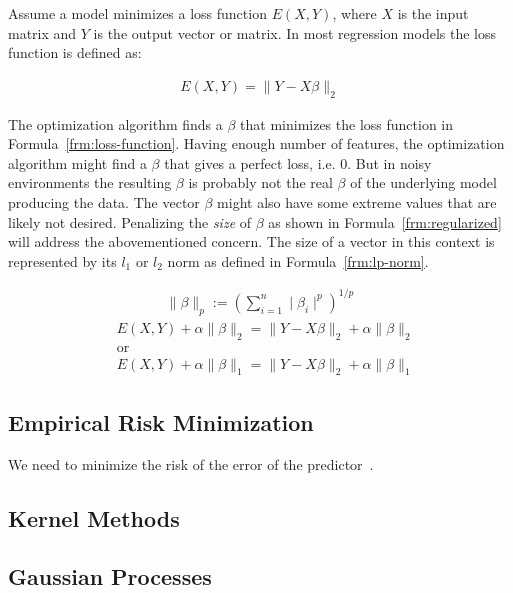 Assume a model minimizes a loss function $E(X, Y)$, where $X$ is the input matrix and $Y$ is the output vector or matrix. In most regression models the loss function is defined as:

\begin{align}
  E(X, Y) = \parallel Y - X \beta \parallel_2
  \label{frm:loss-function}
\end{align}

The optimization algorithm finds a $\beta$ that minimizes the loss function in Formula~\ref{frm:loss-function}. Having enough number of features, the optimization algorithm might find a $\beta$ that gives a perfect loss, i.e. 0. But in noisy environments the resulting $\beta$ is probably not the real $\beta$ of the underlying model producing the data. The vector $\beta$ might also have some extreme values that are likely not desired. Penalizing the \emph{size} of $\beta$ as shown in Formula~\ref{frm:regularized} will address the abovementioned concern. The size of a vector in this context is represented by its $l_1$ or $l_2$ norm as defined in Formula~\ref{frm:lp-norm}.


\begin{align}
  \parallel \beta \parallel_p := \left(\sum\limits_{i=1}^n \mid \beta_i \mid^p \right)^{1/p}
  \label{frm:lp-norm}
\end{align}
\begin{align}
  &E(X, Y) + \alpha \parallel \beta \parallel_2 = \parallel Y - X \beta \parallel_2 + \alpha \parallel \beta \parallel_2 \nonumber \\
  &\text{or} \nonumber \\
  &E(X, Y) + \alpha \parallel \beta \parallel_1 = \parallel Y - X \beta \parallel_2 + \alpha \parallel \beta \parallel_1
  \label{frm:regularized}
\end{align}

\subsection{Empirical Risk Minimization}
We need to minimize the risk of the error of the predictor~\cite[p.~20]{thenatureofstatisticallearningtheory}.

\subsection{Kernel Methods}

\subsection{Gaussian Processes}

